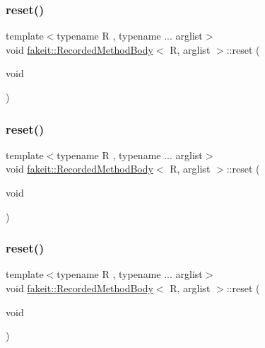 \subsubsection{\texorpdfstring{reset()}{reset()}\hspace{0.1cm}{\footnotesize\ttfamily [3/9]}}
{\footnotesize\ttfamily template$<$typename R , typename ... arglist$>$ \\
void \mbox{\hyperlink{classfakeit_1_1RecordedMethodBody}{fakeit\+::\+Recorded\+Method\+Body}}$<$ R, arglist $>$\+::reset (\begin{DoxyParamCaption}\item[{void}]{ }\end{DoxyParamCaption})\hspace{0.3cm}{\ttfamily [inline]}}

\mbox{\label{classfakeit_1_1RecordedMethodBody_a24512687527253aa107d707e053d1d2e}} 
\subsubsection{\texorpdfstring{reset()}{reset()}\hspace{0.1cm}{\footnotesize\ttfamily [4/9]}}
{\footnotesize\ttfamily template$<$typename R , typename ... arglist$>$ \\
void \mbox{\hyperlink{classfakeit_1_1RecordedMethodBody}{fakeit\+::\+Recorded\+Method\+Body}}$<$ R, arglist $>$\+::reset (\begin{DoxyParamCaption}\item[{void}]{ }\end{DoxyParamCaption})\hspace{0.3cm}{\ttfamily [inline]}}

\mbox{\label{classfakeit_1_1RecordedMethodBody_a24512687527253aa107d707e053d1d2e}} 
\subsubsection{\texorpdfstring{reset()}{reset()}\hspace{0.1cm}{\footnotesize\ttfamily [5/9]}}
{\footnotesize\ttfamily template$<$typename R , typename ... arglist$>$ \\
void \mbox{\hyperlink{classfakeit_1_1RecordedMethodBody}{fakeit\+::\+Recorded\+Method\+Body}}$<$ R, arglist $>$\+::reset (\begin{DoxyParamCaption}\item[{void}]{ }\end{DoxyParamCaption})\hspace{0.3cm}{\ttfamily [inline]}}

